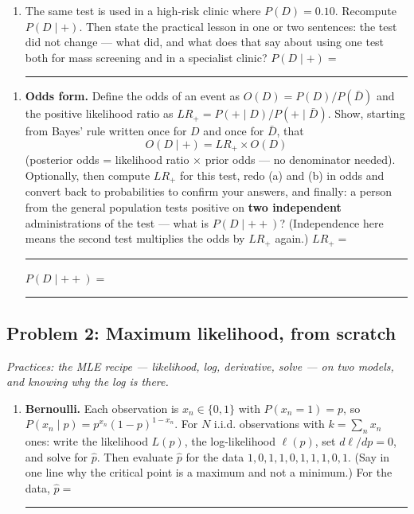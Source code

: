 \documentclass[
  11pt,
]{article}
\providecommand{\tightlist}{%
  \setlength{\itemsep}{0pt}\setlength{\parskip}{0pt}}
\newcommand{\answerspace}[1]{\par\vspace*{#1}}  %
\newcommand{\blank}[1][1.2in]{\rule{#1}{0.4pt}}
\newcommand{\answerpage}{\clearpage}
\begin{document}
\answerspace{2in}

\begin{enumerate}
\def\labelenumi{(\alph{enumi})}
\setcounter{enumi}{1}
\tightlist
\item
  The same test is used in a high-risk clinic where \(P(D) = 0.10\).
  Recompute \(P(D\mid +)\). Then state the practical lesson in one or
  two sentences: the test did not change --- what did, and what does
  that say about using one test both for mass screening and in a
  specialist clinic? \(P(D\mid +) =\) \blank[0.8in]
\end{enumerate}

\answerspace{2in}

\begin{enumerate}
\def\labelenumi{(\alph{enumi})}
\setcounter{enumi}{2}
\tightlist
\item
  \textbf{Odds form.} Define the odds of an event as
  \(O(D) = P(D)/P(\bar D)\) and the positive likelihood ratio as
  \(LR_+ = P(+\mid D)/P(+\mid \bar D)\). Show, starting from Bayes' rule
  written once for \(D\) and once for \(\bar D\), that
  \[O(D\mid +) = LR_+ \times O(D)\] (posterior odds = likelihood ratio ×
  prior odds --- no denominator needed). Optionally, then compute
  \(LR_+\) for this test, redo (a) and (b) in odds and convert back to
  probabilities to confirm your answers, and finally: a person from the
  general population tests positive on \textbf{two independent}
  administrations of the test --- what is \(P(D\mid ++)\)? (Independence
  here means the second test multiplies the odds by \(LR_+\) again.)
  \(LR_+ =\) \blank[0.6in]\quad \(P(D\mid ++) =\) \blank[0.8in]
\end{enumerate}

\answerspace{4in}

\answerpage

\subsection{Problem 2: Maximum likelihood, from
scratch}\label{problem-2-maximum-likelihood-from-scratch}

\emph{Practices: the MLE recipe --- likelihood, log, derivative, solve
--- on two models, and knowing why the log is there.}

\begin{enumerate}
\def\labelenumi{(\alph{enumi})}
\tightlist
\item
  \textbf{Bernoulli.} Each observation is \(x_n\in\{0,1\}\) with
  \(P(x_n = 1) = p\), so \(P(x_n\mid p) = p^{x_n}(1-p)^{1-x_n}\). For
  \(N\) i.i.d. observations with \(k = \sum_n x_n\) ones: write the
  likelihood \(L(p)\), the log-likelihood \(\ell(p)\), set
  \(d\ell/dp = 0\), and solve for \(\hat p\). Then evaluate \(\hat p\)
  for the data \(1,0,1,1,0,1,1,1,0,1\). (Say in one line why the
  critical point is a maximum and not a minimum.) For the data,
  \(\hat p =\) \blank[0.8in]
\end{enumerate}
\end{document}
